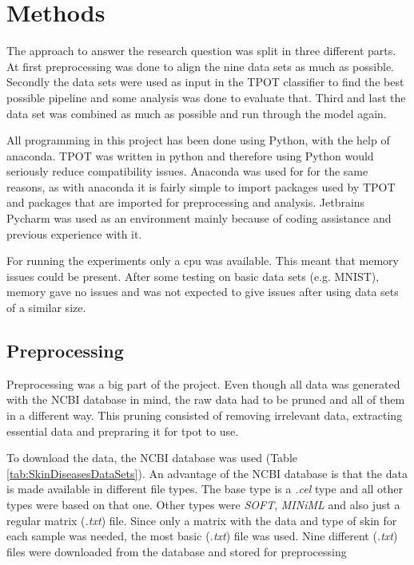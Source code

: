 \documentclass[10pt,a4paper]{article}
\begin{document}
	\section{Methods}
	\label{sec:Methods}
	
	The approach to answer the research question was split in three different parts. At first preprocessing was done to align the nine data sets as much as possible. Secondly the data sets were used as input in the TPOT classifier to find the best possible pipeline and some analysis was done to evaluate that. Third and last the data set was combined as much as possible and run through the model again. 
	
	All programming in this project has been done using Python, with the help of anaconda. TPOT was written in python and therefore using Python would seriously reduce compatibility issues. Anaconda was used for for the same reasons, as with anaconda it is fairly simple to import packages used by TPOT and packages that are imported for preprocessing and analysis. Jetbrains Pycharm was used as an environment mainly because of coding assistance and previous experience with it.
	
	
	For running the experiments only a cpu was available. This meant that memory issues could be present. After some testing on basic data sets (e.g. MNIST), memory gave no issues and was not expected to give issues after using data sets of a similar size.
	
	\subsection{Preprocessing}
	\label{subsec:Preprocessing}
	
	Preprocessing was a big part of the project. Even though all data was generated with the NCBI database \cite{edgar2002gene} in mind, the raw data had to be pruned and all of them in a different way. This pruning consisted of removing irrelevant data, extracting essential data and prepraring it for tpot to use. 
	
	To download the data, the NCBI database was used (Table \ref{tab:SkinDiseasesDataSets}).  An advantage of the NCBI database is that the data is made available in different file types. The base type is a  \textit{.cel} type and all other types were based on that one. Other types were \textit{SOFT}, \textit{MINiML} and also just a regular matrix (\textit{.txt}) file. Since only a matrix with the data and type of skin for each sample was needed, the most basic (\textit{.txt}) file was used. Nine different (\textit{.txt}) files were downloaded from the database and stored for preprocessing
	
\end{document}
